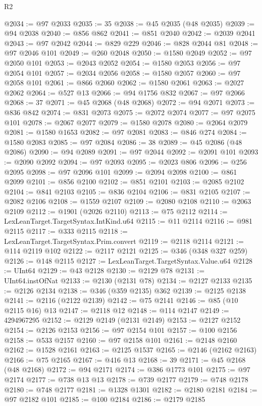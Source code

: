 \begin{lexlean}{R2}
\begin{coremodule}
@2034 := @97 @2033
@2035 := 35
@2038 := @45 @2035 (@48 @2035)
@2039 := @94 @2038
@2040 := @856 @862
@2041 := @851 @2040
@2042 := @2039 @2041
@2043 := @97 @2042
@2044 := @829 @229
@2046 := @828 @2044 @81
@2048 := @97 @2046 @101
@2049 := @260 @2048
@2050 := @1580 @2049
@2052 := @97 @2050 @101
@2053 := @2043 @2052
@2054 := @1580 @2053
@2056 := @97 @2054 @101
@2057 := @2034 @2056
@2058 := @1580 @2057
@2060 := @97 @2058 @101
@2061 := @866 @2060
@2062 := @1580 @2061
@2063 := @2027 @2062
@2064 := @527 @13
@2066 := @94 @1756 @832
@2067 := @97 @2066
@2068 := 37
@2071 := @45 @2068 (@48 @2068)
@2072 := @94 @2071
@2073 := @836 @842
@2074 := @831 @2073
@2075 := @2072 @2074
@2077 := @97 @2075 @101
@2078 := @2067 @2077
@2079 := @1580 @2078
@2080 := @2064 @2079
@2081 := @1580 @1653
@2082 := @97 @2081
@2083 := @846 @274
@2084 := @1580 @2083
@2085 := @97 @2084
@2086 := 38
@2089 := @45 @2086 (@48 @2086)
@2090 := @94 @2089
@2091 := @97 @2044
@2092 := @2091 @101
@2093 := @2090 @2092
@2094 := @97 @2093
@2095 := @2023 @806
@2096 := @256 @2095
@2098 := @97 @2096 @101
@2099 := @2094 @2098
@2100 := @861 @2099
@2101 := @856 @2100
@2102 := @851 @2101
@2103 := @2085 @2102
@2104 := @841 @2103
@2105 := @836 @2104
@2106 := @831 @2105
@2107 := @2082 @2106
@2108 := @1559 @2107
@2109 := @2080 @2108
@2110 := @2063 @2109
@2112 := @1901 (@2026 @2110)
@2113 := @75 @2112
@2114 := LexLeanTarget.TargetSyntax.IntKind.u64
@2115 := @11 @2114
@2116 := @981 @2115
@2117 := @333 @2115
@2118 := LexLeanTarget.TargetSyntax.Prim.convert
@2119 := @2118 @2114
@2121 := @114 @2119 @102
@2122 := @2117 @2121
@2125 := @346 (@348 @327 @259)
@2126 := @148 @2115
@2127 := LexLeanTarget.TargetSyntax.Value.u64
@2128 := UInt64
@2129 := @43 @2128
@2130 := @2129 @78
@2131 := UInt64.instOfNat
@2133 := @2130 (@2131 @78)
@2134 := @2127 @2133
@2135 := @2126 @2134
@2138 := @346 (@359 @2135) @362
@2139 := @2125 @2138
@2141 := @2116 (@2122 @2139)
@2142 := @75 @2141
@2146 := @85 (@10 @2115 @16) @13
@2147 := @2118 @12
@2148 := @114 @2147
@2149 := 4294967295
@2152 := @2129 @2149 (@2131 @2149)
@2153 := @2127 @2152
@2154 := @2126 @2153
@2156 := @97 @2154 @101
@2157 := @100 @2156
@2158 := @533 @2157
@2160 := @97 @2158 @101
@2161 := @2148 @2160
@2162 := @1528 @2161
@2163 := @2125 @1537
@2165 := @2146 (@2162 @2163)
@2166 := @75 @2165
@2167 := @416 @13
@2168 := 39
@2171 := @45 @2168 (@48 @2168)
@2172 := @94 @2171
@2174 := @386 @1773 @101
@2175 := @97 @2174
@2177 := @738 @13 @13
@2178 := @739 @2177
@2179 := @748 @2178
@2180 := @748 @2177
@2181 := @1328 @1301
@2182 := @2180 @2181
@2184 := @97 @2182 @101
@2185 := @100 @2184
@2186 := @2179 @2185

\end{coremodule}
\end{lexlean}
